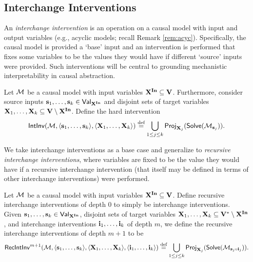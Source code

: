 \documentclass[twoside,11pt]{article}
\begin{document}
\subsection{Interchange Interventions}\label{sec:interchange}
An \textit{interchange intervention} \citep{geiger-etal:2020:blackbox, geiger2021causal} is an operation on a causal model with input and output variables (e.g., acyclic models; recall Remark \ref{rem:acyc}).  Specifically, the causal model is provided a `base' input and an intervention is performed that fixes some variables to be the values they would have if different `source' inputs were provided. Such interventions will be central to grounding mechanistic interpretability in causal abstraction. 

\begin{definition}\label{def:interchange}
Let $\model$ be a causal model with input variables $\inputvars \subseteq \allvars$. Furthermore, consider source inputs $\source_1, \dots, \source_k \in \values{\inputvars}$ and disjoint sets of target variables $\vars_1, \dots, \vars_k \subseteq \allvars \setminus \inputvars$. Define the hard intervention
\[\intinv(\model,\langle \source_1, \dots ,\source_k \rangle, \langle \vars_1, \dots, \vars_k\rangle) \overset{\textnormal{def}}{=}
\bigcup_{1\leq j \leq k} \project{\sols(\model_{\source_j})}{\vars_j}.\]
\end{definition}
We take interchange interventions as a base case and generalize to \textit{recursive interchange interventions}, where variables are fixed to be the value they would have if a recursive interchange intervention (that itself may be defined in terms of other interchange interventions) were performed.
\begin{definition}\label{def:recinterchange}
Let $\model$ be a causal model with input variables $\inputvars \subseteq \allvars$. Define recursive interchange interventions of depth $0$ to simply be interchange interventions. Given $\source_1, \dots, \source_k \in \values{\inputvars}$, disjoint sets of target variables $\vars_1, \dots, \vars_k \subseteq \allvars^* \setminus \inputvars$, and interchange interventions $\intpset_1, \dots, \intpset_k$ of depth $m$, we define the recursive interchange interventions of depth $m+1$ to be
\[\rintinv^{m+1}(\model,\langle \source_1, \dots ,\source_k \rangle, \langle \vars_1, \dots, \vars_k\rangle, \langle\intpset_{1}, \dots, \intpset_{k} \rangle) \overset{\textnormal{def}}{=}
\bigcup_{1\leq j \leq k} \project{\sols(\model_{\source_j \circ \intpset_j})}{\vars_j}.\]
\end{definition}
\end{document}
